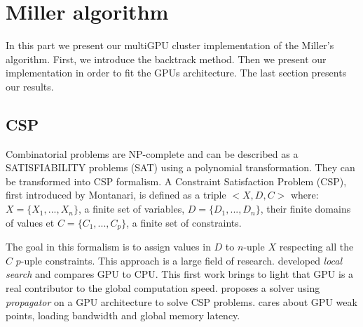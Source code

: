 \section{Miller algorithm}

In this part we present our multiGPU cluster implementation of the Miller's algorithm. First, we introduce the backtrack method. Then we present our implementation in order to fit the GPUs architecture. The last section presents our results. 

\subsection{CSP}

Combinatorial problems are NP-complete\cite{GJ79} and can be described as a SATISFIABILITY problems (SAT) using a polynomial transformation. 
They can be transformed into CSP formalism.
A Constraint Satisfaction Problem (CSP), first introduced by Montanari\cite{Mon74}, is defined as a triple $<X,D,C>$ where:
$X=\{X_1,...,X_n\}$, a finite set of variables, $D=\{D_1,...,D_n\}$, their finite domains of values et $C=\{C_1,...,C_p\}$, a finite set of constraints.

The goal in this formalism is to assign values in $D$ to $n$-uple $X$ respecting all the $C$ $p$-uple constraints.
This approach is a large field of research. \cite{arbelaez2014gpu} developed \textit{local search} and compares GPU to CPU. 
This first work brings to light that GPU is a real contributor to the global computation speed. \cite{campeotto2014exploring} proposes a solver using \textit{propagator} on a GPU architecture to solve CSP problems. 
\cite{jenkins2011lessons} cares about GPU weak points, loading bandwidth and global memory latency.


